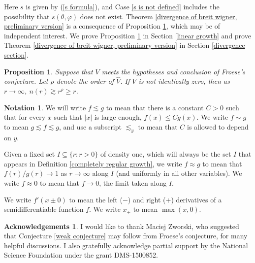 \documentclass[reqno,12pt,letterpaper]{amsart}
\newtheorem{proposition}[theorem]{Proposition}
\theoremstyle{definition}
\newtheorem*{ack}{Acknowledgements}
\newtheorem*{notate}{Notation}
\begin{document}
Here $s$ is given by (\ref{s formula}), and Case \ref{s is not defined} includes the possibility that $s(\theta, \varphi)$ does not exist.
Theorem \ref{divergence of breit wigner, preliminary version} is a consequence of Proposition \ref{linear lower bound}, which may be of independent interest.
We prove Proposition \ref{linear lower bound} in Section \ref{linear growth}
and prove Theorem \ref{divergence of breit wigner, preliminary version} in Section \ref{divergence section}.
\begin{proposition}
\label{linear lower bound}
Suppose that $V$ meets the hypotheses and conclusion of Froese's conjecture. Let $\rho$ denote the order of $\widehat V$. If $V$ is not identically zero, then as $r \to \infty$, $n(r) \gtrsim r^\rho \geq r$.
\end{proposition}

\begin{notate}
We will write $f \lesssim g$ to mean that there is a constant $C > 0$ such that for every $x$ such that $|x|$ is large enough, $f(x) \leq Cg(x)$.
We write $f \sim g$ to mean $g \lesssim f \lesssim g$, and use a subscript $\lesssim_y$ to mean that $C$ is allowed to depend on $y$.

Given a fixed set $I \subseteq \{r: r > 0\}$ of density one, which will always be the set $I$ that appears in Definition \ref{completely regular growth}, we write $f \approx g$ to mean that $f(r)/g(r) \to 1$ as $r \to \infty$ along $I$ (and uniformly in all other variables). We write $f \approx 0$ to mean that $f \to 0$, the limit taken along $I$.

We write $f'(x\pm 0)$ to mean the left ($-$) and right ($+$) derivatives of a semidifferentiable function $f$. We write $x_+$ to mean $\max(x, 0)$.
\end{notate}

\begin{ack}
I would like to thank Maciej Zworski, who suggested that Conjecture \ref{weak conjecture} may follow from Froese's conjecture, for many helpful discussions. I also gratefully acknowledge partial support by the National Science Foundation under the grant DMS-1500852.
\end{ack}
\end{document}
